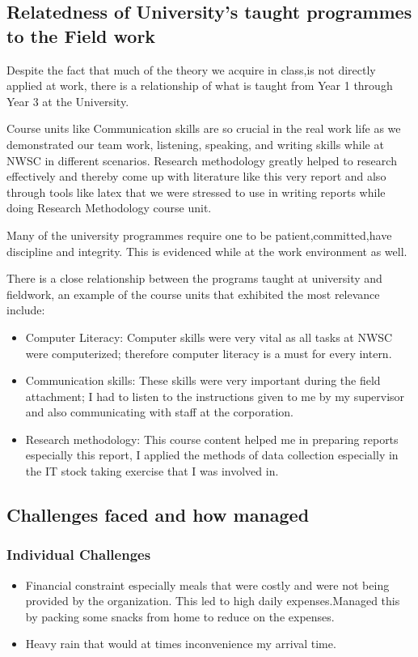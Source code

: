 \documentclass{article}
\begin{document}
\subsection{Relatedness of University's taught programmes to the Field work}
Despite the fact that much of the theory we acquire in class,is not directly applied at work, there is a  relationship  of what is taught from Year 1 through Year 3 at the University.
\par Course units like Communication skills are so crucial in the real work life as we demonstrated
our team work, listening, speaking, and writing skills while at NWSC in different scenarios.  Research methodology greatly helped to research effectively and thereby come up with literature like this very report and also through tools like latex that we were stressed to use in writing reports while doing Research Methodology course unit.
\par Many of the university programmes require one to be  patient,committed,have discipline
and integrity. This is evidenced while at the work environment as well.
\par There is a close relationship between the programs taught at university and fieldwork, an example of the course units that exhibited the most relevance include:
\begin{itemize}
\item Computer Literacy: Computer skills were very vital as all tasks at NWSC were computerized; therefore computer literacy is a must for every intern.
\item Communication skills: These skills were very important during the field attachment; I had to listen to the instructions given to me by my supervisor and also communicating with staff at the corporation.
\item Research methodology: This course content helped me in preparing reports especially this report, I applied the
methods of data collection especially in the IT stock taking exercise that I was involved in.
\end{itemize}
\subsection{Challenges faced and how managed}
\subsubsection{Individual Challenges}
\begin{itemize}
\item Financial constraint especially meals that were costly and were not being  provided by the organization. This led to high daily expenses.Managed this by packing some snacks from home to reduce on the expenses.
\item Heavy rain that would at times inconvenience my arrival time.
\end{itemize}
\end{document}
